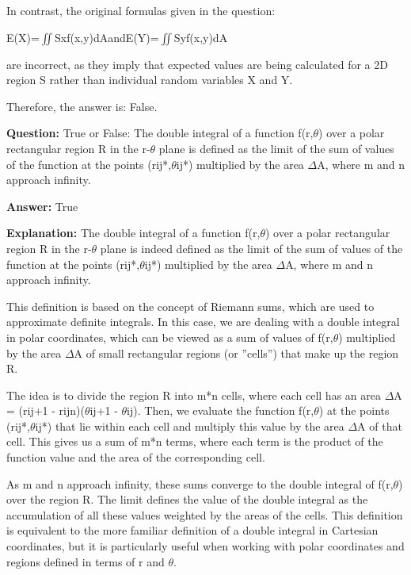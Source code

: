 \documentclass{article}
\begin{document}
In contrast, the original formulas given in the question:

E(X)=\ensuremath{\iint}Sxf(x,y)dAandE(Y)=\ensuremath{\iint}Syf(x,y)dA

are incorrect, as they imply that expected values are being calculated for a 2D region S rather than individual random variables X and Y.

Therefore, the answer is: False.
                
                \vspace{0.5cm} 
        
            
                \textbf {Question:} True or False: The double integral of a function f(r,\ensuremath{\theta}) over a polar rectangular region R in the r-\ensuremath{\theta} plane is defined as the limit of the sum of values of the function at the points (rij*,\ensuremath{\theta}ij*) multiplied by the area \ensuremath{\Delta}A, where m and n approach infinity.
                
                \textbf{Answer:} True

                \textbf{Explanation:} The double integral of a function f(r,\ensuremath{\theta}) over a polar rectangular region R in the r-\ensuremath{\theta} plane is indeed defined as the limit of the sum of values of the function at the points (rij*,\ensuremath{\theta}ij*) multiplied by the area \ensuremath{\Delta}A, where m and n approach infinity. 

This definition is based on the concept of Riemann sums, which are used to approximate definite integrals. In this case, we are dealing with a double integral in polar coordinates, which can be viewed as a sum of values of f(r,\ensuremath{\theta}) multiplied by the area \ensuremath{\Delta}A of small rectangular regions (or ''cells'') that make up the region R.

The idea is to divide the region R into m*n cells, where each cell has an area \ensuremath{\Delta}A = (rij+1 - rijn)(\ensuremath{\theta}ij+1 - \ensuremath{\theta}ij). Then, we evaluate the function f(r,\ensuremath{\theta}) at the points (rij*,\ensuremath{\theta}ij*) that lie within each cell and multiply this value by the area \ensuremath{\Delta}A of that cell. This gives us a sum of m*n terms, where each term is the product of the function value and the area of the corresponding cell.

As m and n approach infinity, these sums converge to the double integral of f(r,\ensuremath{\theta}) over the region R. The limit defines the value of the double integral as the accumulation of all these values weighted by the areas of the cells. This definition is equivalent to the more familiar definition of a double integral in Cartesian coordinates, but it is particularly useful when working with polar coordinates and regions defined in terms of r and \ensuremath{\theta}.
                
\end{document}
